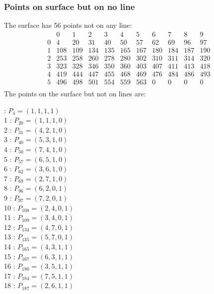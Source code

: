 \documentclass{article}
\begin{document}
{\subsubsection*{Points on surface but on no line}
The surface has 56 points not on any line:\\
$$
\begin{array}{r|*{10}{r}}
 & 0 & 1 & 2 & 3 & 4 & 5 & 6 & 7 & 8 & 9\\
\hline
0 & 4 & 20 & 31 & 40 & 50 & 57 & 62 & 69 & 96 & 97\\
1 & 108 & 109 & 134 & 135 & 165 & 167 & 180 & 184 & 187 & 190\\
2 & 253 & 258 & 260 & 278 & 280 & 302 & 310 & 311 & 314 & 320\\
3 & 323 & 328 & 346 & 350 & 360 & 403 & 407 & 411 & 413 & 418\\
4 & 419 & 444 & 447 & 455 & 468 & 469 & 476 & 484 & 486 & 493\\
5 & 496 & 498 & 501 & 554 & 559 & 563 & 0 & 0 & 0 & 0\\
\end{array}
$$
The points on the surface but not on lines are:\\
\begin{multicols}{2}
 : $P_{4}=( 1, 1, 1, 1 )$\\
1 : $P_{20}=( 1, 1, 1, 0 )$\\
2 : $P_{31}=( 4, 2, 1, 0 )$\\
3 : $P_{40}=( 5, 3, 1, 0 )$\\
4 : $P_{50}=( 7, 4, 1, 0 )$\\
5 : $P_{57}=( 6, 5, 1, 0 )$\\
6 : $P_{62}=( 3, 6, 1, 0 )$\\
7 : $P_{69}=( 2, 7, 1, 0 )$\\
8 : $P_{96}=( 6, 2, 0, 1 )$\\
9 : $P_{97}=( 7, 2, 0, 1 )$\\
10 : $P_{108}=( 2, 4, 0, 1 )$\\
11 : $P_{109}=( 3, 4, 0, 1 )$\\
12 : $P_{134}=( 4, 7, 0, 1 )$\\
13 : $P_{135}=( 5, 7, 0, 1 )$\\
14 : $P_{165}=( 4, 3, 1, 1 )$\\
15 : $P_{167}=( 6, 3, 1, 1 )$\\
16 : $P_{180}=( 3, 5, 1, 1 )$\\
17 : $P_{184}=( 7, 5, 1, 1 )$\\
18 : $P_{187}=( 2, 6, 1, 1 )$\\

\end{multicols}}
\end{document}
